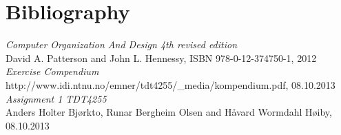 \section{Bibliography}

\begin{enumerate}
     \emph{Computer Organization And Design 4th revised edition}\\
        David A. Patterson and John L. Hennessy, ISBN 978-0-12-374750-1, 2012
     \emph{Exercise Compendium}\\
        http://www.idi.ntnu.no/emner/tdt4255/\_media/kompendium.pdf, 08.10.2013
     \emph{Assignment 1 TDT4255}\\
        Anders Holter Bjørkto, Runar Bergheim Olsen and Håvard Wormdahl Høiby, 08.10.2013
\end{enumerate}